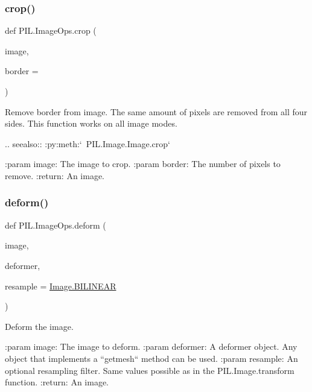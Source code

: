 \subsubsection{\texorpdfstring{crop()}{crop()}}
{\footnotesize\ttfamily def P\+I\+L.\+Image\+Ops.\+crop (\begin{DoxyParamCaption}\item[{}]{image,  }\item[{}]{border = {} }\end{DoxyParamCaption})}

\begin{DoxyVerb}Remove border from image.  The same amount of pixels are removed
from all four sides.  This function works on all image modes.

.. seealso:: :py:meth:`~PIL.Image.Image.crop`

:param image: The image to crop.
:param border: The number of pixels to remove.
:return: An image.
\end{DoxyVerb}
 \mbox{\label{namespacePIL_1_1ImageOps_a0807122504af438786dd05e716c357b8}} 
\subsubsection{\texorpdfstring{deform()}{deform()}}
{\footnotesize\ttfamily def P\+I\+L.\+Image\+Ops.\+deform (\begin{DoxyParamCaption}\item[{}]{image,  }\item[{}]{deformer,  }\item[{}]{resample = {\ttfamily \hyperlink{namespacePIL_1_1Image_ad4b661d0dee54be6240599760dcf45c8}{Image.\+B\+I\+L\+I\+N\+E\+AR}} }\end{DoxyParamCaption})}

\begin{DoxyVerb}Deform the image.

:param image: The image to deform.
:param deformer: A deformer object.  Any object that implements a
                ``getmesh`` method can be used.
:param resample: An optional resampling filter. Same values possible as
   in the PIL.Image.transform function.
:return: An image.
\end{DoxyVerb}
 \mbox{\label{namespacePIL_1_1ImageOps_a1a95dfa2e8119aac5eb69f1d83dc63b5}} 
